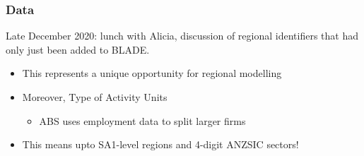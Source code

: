 \documentclass[handout,english]{beamer}
\begin{document}
\begin{frame}
  \frametitle{Data}
  Late December 2020: lunch with Alicia, discussion of regional
  identifiers that had only just been added to BLADE.
  \begin{itemize}
    \item This represents a unique opportunity for regional modelling
    \item Moreover, Type of Activity Units
      \begin{itemize}
        \item ABS uses employment data to split larger firms
      \end{itemize}
    \item This means upto SA1-level regions and 4-digit ANZSIC sectors!
  \end{itemize}

\end{frame}
\end{document}

